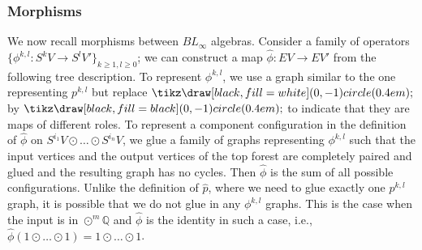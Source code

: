 \documentclass[11pt]{amsart}
\numberwithin{equation}{section}
\def\Q{{\mathbb Q}}
\begin{document}
\subsubsection{Morphisms} We now recall morphisms between $BL_{\infty}$ algebras. Consider a family of operators $\{\phi^{k,l}:S^k V\to S^l V'\}_{k\ge 1,l\ge 0}$; we can construct a map $\widehat{\phi}:EV\to EV'$ from the following tree description. To represent $\phi^{k,l}$, we use a graph similar to the one representing $p^{k,l}$ but replace $\tikz\draw[black,fill=white] (0,-1) circle (0.4em);$ by $\tikz\draw[black,fill=black] (0,-1) circle (0.4em);$ to indicate that they are maps of different roles. To represent a component configuration in the definition of $\widehat{\phi}$ on $S^{i_1}V\odot\ldots \odot S^{i_n}V$, we glue a family of graphs representing $\phi^{k,l}$ such that the input vertices and the output vertices of the top forest are completely paired and glued and the resulting graph has no cycles. Then $\widehat{\phi}$ is the sum of all possible configurations. Unlike the definition of $\widehat{p}$, where we need to glue exactly one $p^{k,l}$ graph, it is possible that we do not glue in any $\phi^{k,l}$ graphs. This is the case when the input is in $\odot^m\Q$ and $\widehat{\phi}$ is the identity in such a case, i.e., $\widehat{\phi}(1\odot \ldots \odot 1) = 1\odot \ldots \odot 1$.
\end{document}
